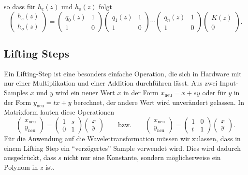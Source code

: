 so dass für $h_e(z)$ und $h_o(z)$ folgt
\[
\begin{pmatrix} h_e(z)\\h_o(z)\end{pmatrix}
=
\begin{pmatrix} q_0(z)&1\\1&0 \end{pmatrix}
\begin{pmatrix} q_1(z)&1\\1&0 \end{pmatrix}
\cdots
\begin{pmatrix} q_n(z)&1\\1&0 \end{pmatrix}
\begin{pmatrix} K(z) \\ 0 \end{pmatrix}.
\]

\subsection{Lifting Steps}
Ein Lifting-Step ist eine besonders einfache Operation, die sich in
Hardware mit nur einer Multiplikation und einer Addition durchführen lässt.
Aus zwei Input-Samples $x$ und $y$ wird ein neuer Wert $x$ 
in der Form $x_{\text{neu}}=x+sy$ oder für $y$ in der Form
$y_{\text{neu}}=tx+y$ berechnet, der andere Wert wird unverändert
gelassen.
In Matrixform lauten diese Operationen
\[
\begin{pmatrix} x_{\text{neu}}\\y_{\text{neu}} \end{pmatrix}
=
\begin{pmatrix} 1&s \\ 0&1\end{pmatrix}
\begin{pmatrix}x\\y\end{pmatrix}
\qquad\text{bzw.}\qquad
\begin{pmatrix} x_{\text{neu}}\\y_{\text{neu}} \end{pmatrix}
=
\begin{pmatrix} 1&0 \\ t&1\end{pmatrix}
\begin{pmatrix}x\\y\end{pmatrix}.
\]
Für die Anwendung auf die Wavelettransformation müssen wir zulassen,
dass in einem Lifting Step ein ``verzögertes'' Sample verwendet wird.
Dies wird dadurch ausgedrückt, dass $s$ nicht nur eine Konstante,
sondern möglicherweise ein Polynom in $z$ ist.

